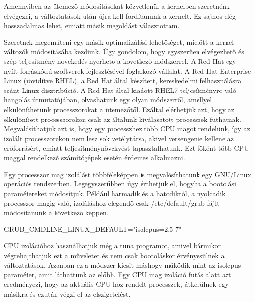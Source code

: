 Amennyiben az ütemező módosításokat közvetlenül a kernelben szeretnénk elvégezni, a változtatások után újra kell fordítanunk a kernelt.
Ez sajnos elég hosszadalmas lehet, emiatt másik megoldást választottam.


Szeretnék megemlíteni egy másik optimalizálási lehetőséget, mielőtt a kernel változók módosításába kezdünk. Úgy gondolom, hogy egyszerűen elvégezhető és szép teljesítmény növekedés nyerhető a következő módszerrel.
A Red Hat egy nyílt forráskódú szoftverek fejlesztésével foglalkozó vállalat. A Red Hat Enterprise Linux (rövidítve RHEL), a Red Hat által készített, kereskedelmi felhasználásra szánt Linux-disztribúció.
A Red Hat által kiadott RHEL7 teljesítményre való hangolás útmutatójában, olvashatunk egy olyan módszerről, amellyel elkülöníthetünk processzorokat a ütemezőtől. Ezáltal elérhetjük azt, hogy az elkülönített processzorokon csak az általunk kiválasztott processzek futhatnak. Megvalósíthatjuk azt is, hogy egy processzhez több CPU magot rendelünk, így az izolált processzorokon nem lesz sok vetélytársa, akivel versengenie kellene az erőforrásért, emiatt teljesítménynövekvést tapasztalhatunk.
Ezt főként több CPU maggal rendelkező számítógépek esetén érdemes alkalmazni.

Egy processzor mag izolálást többféleképpen is megvalósíthatunk egy GNU/Linux operációs rendszerben.
Legegyszerűbben úgy érthetjük el, hogyha a bootolási paramétereket módosítjuk. Például harmadik és a hatodiktól, a nyolcadik processzor magig való, izoláláshoz elegendő csak /etc/default/grub fájlt módosítanunk a következő képpen.

\begin{python}
GRUB_CMDLINE_LINUX_DEFAULT="isolcpus=2,5-7"
\end{python}

CPU izolációhoz használhatjuk még a tuna programot, amivel bármikor végrehajthatjuk ezt a műveletet és nem csak bootoláskor érvényesülnek a változtatások. Azonban ez a módszer kicsit máshogy működik mint az isolcpus paraméter, amit láthattunk az előbb. Egy CPU mag izoláció futás alatt azt eredményezi, hogy az aktuális CPU-hoz rendelt processzek, átkerülnek egy másikra és ezután végzi el az elszigetelést.

